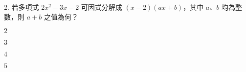 \documentclass[12pt]{article}
\begin{document}
\begin{problem}
  \item[2.] 若多項式 $2x^2 - 3x - 2$ 可因式分解成 $(x - 2)(ax + b)$，其中 $a$、$b$ 均為整數，則 $a + b$ 之值為何？
  \begin{choices}
    \item $2$
    \item $3$
    \item $4$
    \item $5$
  \end{choices}
\end{problem}
\end{document}
